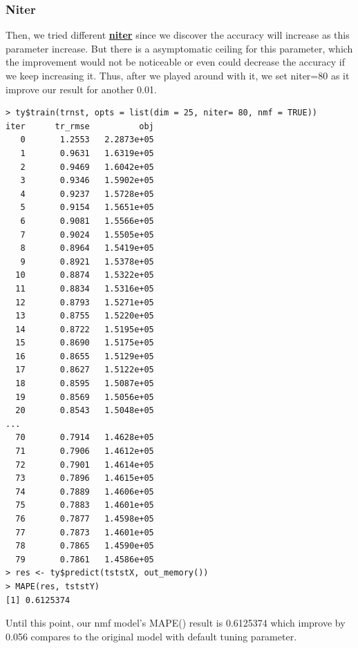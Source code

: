 \documentclass[11pt]{article}
\newcommand\tab[1][0.5cm]{\hspace*{#1}}
\begin{document}
\subsubsection{Niter}
\tab{}Then, we tried different \textbf{\underline{niter}} since we discover the accuracy will increase as this parameter increase. But there is a asymptomatic ceiling for this parameter, which the improvement would not be noticeable or even could decrease the accuracy if we keep increasing it. Thus, after we played around with it, we set niter=80 as it improve our result for another 0.01.
\begin{verbatim}
> ty$train(trnst, opts = list(dim = 25, niter= 80, nmf = TRUE))
iter      tr_rmse          obj
   0       1.2553   2.2873e+05
   1       0.9631   1.6319e+05
   2       0.9469   1.6042e+05
   3       0.9346   1.5902e+05
   4       0.9237   1.5728e+05
   5       0.9154   1.5651e+05
   6       0.9081   1.5566e+05
   7       0.9024   1.5505e+05
   8       0.8964   1.5419e+05
   9       0.8921   1.5378e+05
  10       0.8874   1.5322e+05
  11       0.8834   1.5316e+05
  12       0.8793   1.5271e+05
  13       0.8755   1.5220e+05
  14       0.8722   1.5195e+05
  15       0.8690   1.5175e+05
  16       0.8655   1.5129e+05
  17       0.8627   1.5122e+05
  18       0.8595   1.5087e+05
  19       0.8569   1.5056e+05
  20       0.8543   1.5048e+05
...
  70       0.7914   1.4628e+05
  71       0.7906   1.4612e+05
  72       0.7901   1.4614e+05
  73       0.7896   1.4615e+05
  74       0.7889   1.4606e+05
  75       0.7883   1.4601e+05
  76       0.7877   1.4598e+05
  77       0.7873   1.4601e+05
  78       0.7865   1.4590e+05
  79       0.7861   1.4586e+05
> res <- ty$predict(tststX, out_memory())
> MAPE(res, tststY)
[1] 0.6125374
\end{verbatim}
\tab{}Until this point, our nmf model's MAPE() result is 0.6125374 which improve by 0.056 compares to the original model with default tuning parameter. 
\end{document}
